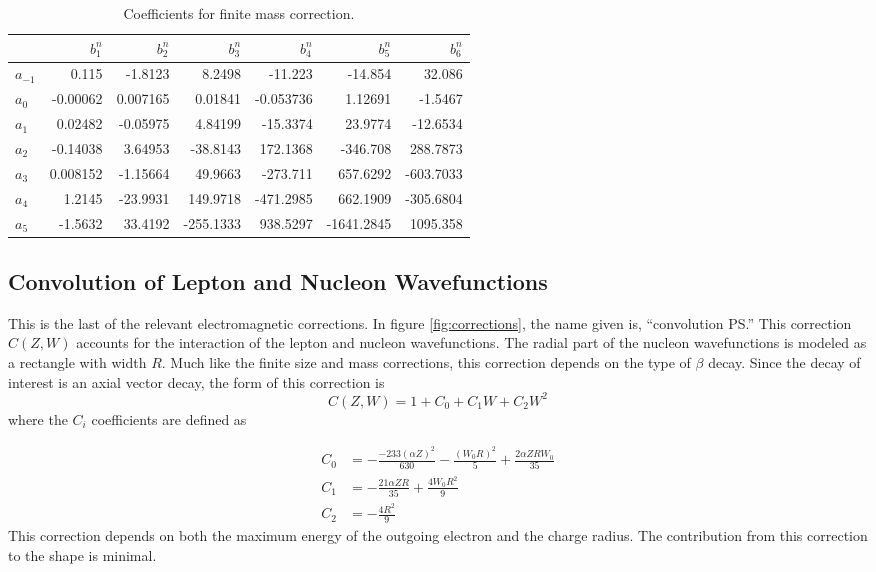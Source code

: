 \documentclass[../MaxHughesThesis.tex]{subfiles}
\begin{document}
\begin{table}[!hbt]
	\centering
	\caption{Coefficients for finite mass correction.}
		\begin{tabular}{lrrrrrr} \hline \hline
		         & $b^{n}_{1}$ & $b^{n}_{2}$ & $b^{n}_{3}$ & $b^{n}_{4}$ & $b^{n}_{5}$ & $b^{n}_{6}$ \\ \hline
		$a_{-1}$ & 0.115 & -1.8123 & 8.2498 & -11.223 & -14.854 & 32.086 \\
		$a_{0}$  & -0.00062 & 0.007165 & 0.01841 & -0.053736 & 1.12691 & -1.5467 \\
		$a_{1}$  & 0.02482 & -0.05975 & 4.84199 & -15.3374 & 23.9774 & -12.6534 \\
		$a_{2}$  & -0.14038 & 3.64953 & -38.8143 & 172.1368 & -346.708 & 288.7873 \\
		$a_{3}$  & 0.008152 & -1.15664 & 49.9663 & -273.711 & 657.6292 & -603.7033 \\
		$a_{4}$  & 1.2145 & -23.9931 & 149.9718 & -471.2985 & 662.1909 & -305.6804 \\
		$a_{5}$  & -1.5632 & 33.4192 & -255.1333 & 938.5297 & -1641.2845 & 1095.358 \\ \hline \hline
		\end{tabular}
	\label{tab:bcoef}
\end{table}

\subsection{Convolution of Lepton and Nucleon Wavefunctions}

This is the last of the relevant electromagnetic corrections.
In figure \ref{fig:corrections}, the name given is, ``convolution PS.''
This correction $C(Z,W)$ accounts for the interaction of the lepton and nucleon wavefunctions. 
The radial part of the nucleon wavefunctions is  modeled as a rectangle with width $R$.
Much like the finite size and mass corrections, this correction depends on the type of $\beta$ decay.
Since the decay of interest is an axial vector decay, the form of this correction is %
\begin{equation}
	C(Z,W) = 1 + C_{0} + C_{1} W + C_{2} W^{2}
	\label{eq:nucandlepconv}
\end{equation}
where the $C_{i}$ coefficients are defined as \cite{WIL90} %

\begin{equation}
	\label{eq:csconvocorrection}
	\begin{split}
	C_{0} & = -\frac{-233(\alpha Z)^{2}}{630} - \frac{(W_{0} R)^{2}}{5} + \frac{2 \alpha Z R W_{0}}{35} \\
	C_{1} & = -\frac{21 \alpha Z R}{35} + \frac{4 W_{0} R^{2}}{9} \\
	C_{2} & = -\frac{4 R^{2}}{9}
	\end{split}
\end{equation}
This correction depends on both the maximum energy of the outgoing electron and the charge radius.
The contribution from this correction to the shape is minimal. 
\end{document}
